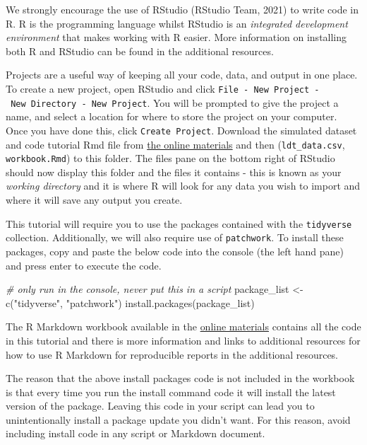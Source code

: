 \documentclass[
  english,
  doc,floatsintext]{apa6}
\newenvironment{Shaded}{\begin{snugshade}}{\end{snugshade}}
\newcommand{\CommentTok}[1]{\textcolor[rgb]{0.56,0.35,0.01}{\textit{#1}}}
\newcommand{\FunctionTok}[1]{\textcolor[rgb]{0.00,0.00,0.00}{#1}}
\newcommand{\NormalTok}[1]{#1}
\newcommand{\OtherTok}[1]{\textcolor[rgb]{0.56,0.35,0.01}{#1}}
\newcommand{\StringTok}[1]{\textcolor[rgb]{0.31,0.60,0.02}{#1}}
\begin{document}
We strongly encourage the use of RStudio (RStudio Team, 2021) to write code in R. R is the programming language whilst RStudio is an \emph{integrated development environment} that makes working with R easier. More information on installing both R and RStudio can be found in the additional resources.

Projects are a useful way of keeping all your code, data, and output in one place. To create a new project, open RStudio and click \texttt{File\ -\ New\ Project\ -\ New\ Directory\ -\ New\ Project}. You will be prompted to give the project a name, and select a location for where to store the project on your computer. Once you have done this, click \texttt{Create\ Project}. Download the simulated dataset and code tutorial Rmd file from \href{https://osf.io/bj83f/files/}{the online materials} and then (\texttt{ldt\_data.csv}, \texttt{workbook.Rmd}) to this folder. The files pane on the bottom right of RStudio should now display this folder and the files it contains - this is known as your \emph{working directory} and it is where R will look for any data you wish to import and where it will save any output you create.

This tutorial will require you to use the packages contained with the \texttt{tidyverse} collection. Additionally, we will also require use of \texttt{patchwork}. To install these packages, copy and paste the below code into the console (the left hand pane) and press enter to execute the code.

\begin{Shaded}
\begin{Highlighting}[]
\CommentTok{\# only run in the console, never put this in a script }
\NormalTok{package\_list }\OtherTok{\textless{}{-}} \FunctionTok{c}\NormalTok{(}\StringTok{"tidyverse"}\NormalTok{, }\StringTok{"patchwork"}\NormalTok{)}
\FunctionTok{install.packages}\NormalTok{(package\_list)}
\end{Highlighting}
\end{Shaded}

The R Markdown workbook available in the \href{https://osf.io/bj83f/files/}{online materials} contains all the code in this tutorial and there is more information and links to additional resources for how to use R Markdown for reproducible reports in the additional resources.

The reason that the above install packages code is not included in the workbook is that every time you run the install command code it will install the latest version of the package. Leaving this code in your script can lead you to unintentionally install a package update you didn't want. For this reason, avoid including install code in any script or Markdown document.
\end{document}
